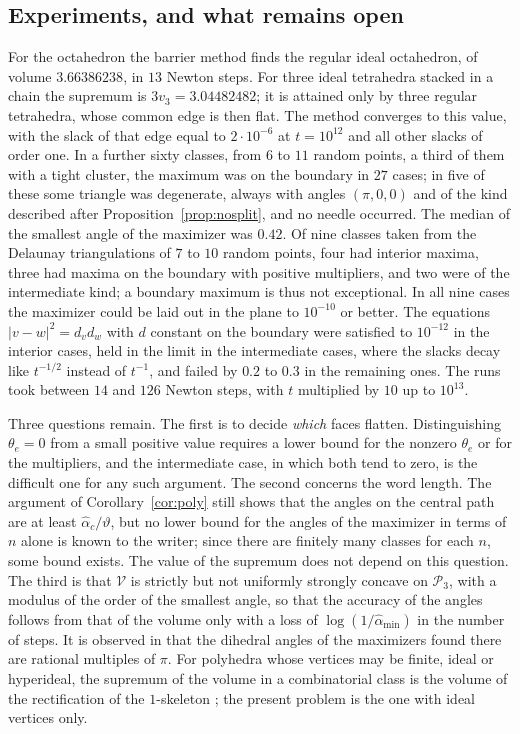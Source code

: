 \documentclass[11pt]{amsart}
\theoremstyle{definition}
\theoremstyle{remark}
\begin{document}
\subsection{Experiments, and what remains open}
For the octahedron the barrier method finds the regular ideal octahedron, of volume $3.66386238$, in $13$ Newton steps. For three ideal tetrahedra stacked in a chain the supremum is $3v_3=3.04482482$; it is attained only by three regular tetrahedra, whose common edge is then flat. The method converges to this value, with the slack of that edge equal to $2\cdot10^{-6}$ at $t=10^{12}$ and all other slacks of order one.
In a further sixty classes, from $6$ to $11$ random points, a third of them with a tight cluster, the maximum was on the boundary in $27$ cases; in five of these some triangle was degenerate, always with angles $(\pi,0,0)$ and of the kind described after Proposition~\ref{prop:nosplit}, and no needle occurred. The median of the smallest angle of the maximizer was $0.42$.
Of nine classes taken from the Delaunay triangulations of $7$ to $10$ random points, four had interior maxima, three had maxima on the boundary with positive multipliers, and two were of the intermediate kind; a boundary maximum is thus not exceptional. In all nine cases the maximizer could be laid out in the plane to $10^{-10}$ or better.
The equations $|v-w|^2=d_vd_w$ with $d$ constant on the boundary were satisfied to $10^{-12}$ in the interior cases, held in the limit in the intermediate cases, where the slacks decay like $t^{-1/2}$ instead of $t^{-1}$, and failed by $0.2$ to $0.3$ in the remaining ones. The runs took between $14$ and $126$ Newton steps, with $t$ multiplied by $10$ up to $10^{13}$.

Three questions remain. The first is to decide \emph{which} faces flatten. Distinguishing $\theta_e=0$ from a small positive value requires a lower bound for the nonzero $\theta_e$ or for the multipliers, and the intermediate case, in which both tend to zero, is the difficult one for any such argument.
The second concerns the word length. The argument of Corollary~\ref{cor:poly} still shows that the angles on the central path are at least $\hat\alpha_c/\vartheta$, but no lower bound for the angles of the maximizer in terms of $n$ alone is known to the writer; since there are finitely many classes for each $n$, some bound exists.
The value of the supremum does not depend on this question. The third is that $\mathcal V$ is strictly but not uniformly strongly concave on $\mathcal P_3$, with a modulus of the order of the smallest angle, so that the accuracy of the angles follows from that of the volume only with a loss of $\log(1/\hat\alpha_{\min})$ in the number of steps.
It is observed in \cite{Riv25} that the dihedral angles of the maximizers found there are rational multiples of $\pi$. For polyhedra whose vertices may be finite, ideal or hyperideal, the supremum of the volume in a combinatorial class is the volume of the rectification of the $1$-skeleton \cite{Bel21}; the present problem is the one with ideal vertices only.
\end{document}

